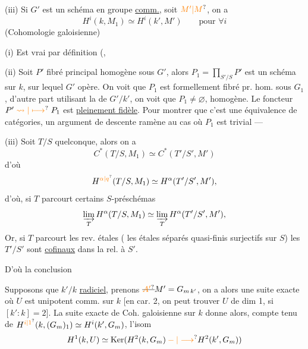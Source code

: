 (iii) Si $G'$ est  un schéma en groupe \uline{comm.}, soit $\unsure{M'|M}$, on a
\[
\boxed{H^i(k,M_1)\simeq H^i(k',M')}\qquad\text{pour }\forall i
\]
(Cohomologie galoisienne)

(i) Est vrai par définition (,

(ii) Soit $P'$ fibré principal homogène sous $G'$, alors $P_1=\prod_{S'/S}P'$ est un schéma sur $k$, sur lequel $G'$ opère. On voit que $P_1$ est formellement fibré pr. hom. sous $G_1$, d'autre  part utilisant la  de $G'/k'$, on voit que $P_1\ne\varnothing$,   homogène.
Le foncteur $P'\mathrel{\unsure{\rightsquigarrow|\longmapsto}}P_1$ est \uline{pleinement fidèle}.
Pour montrer que c'est une équivalence de catégories, un argument de descente ramène au cas où $P_1$ est trivial ---

(iii) Soit $T/S$  quelconque, alors on a
\[
C^*(T/S,M_1)\simeq C^*(T'/S',M')
\]
d'où
\[
H^{\unsure{\alpha|q}}(T/S,M_1)\simeq H^\alpha(T'/S',M'),
\]
d'où, si $T$ parcourt certains $S$-préschémas
\[
\varinjlim_T H^\alpha(T/S,M_1)\simeq\varinjlim_T H^\alpha(T'/S',M'),
\]
Or, si $T$ parcourt les rev. étales ( les  étales séparés quasi-finis surjectifs sur $S$) les $T'/S'$ sont \uline{cofinaux} dans la   rel. à $S'$.

D'où la conclusion

Supposons que $k'/k$  \uline{radiciel}, prenons $\deleted{\unsure{A'}}M'=G_{m\,k'}$, on a alors une suite exacte
où $U$ est unipotent comm.  sur $k$ [en car. 2, on peut trouver $U$ de dim 1,  si $[k':k]=2$]. La suite exacte de Coh. galoisienne sur $k$ donne alors, compte tenu de $H^{\unsure{i|1}}(k,(G_m)_1)\simeq H^i(k',G_m)$, l'isom
\[
H^1(k,U)\simeq\operatorname{Ker}(H^2(k,G_m)\unsure{{}-{ }|\longrightarrow}H^2(k',G_m))
\]

